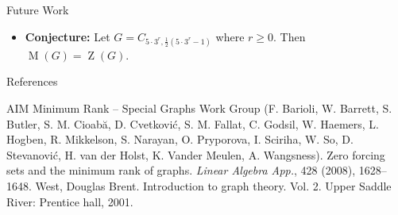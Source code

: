 \documentclass[final]{beamer}
\newcommand{\M}{\operatorname{M}}
\newcommand{\Z}{\operatorname{Z}}
\newcommand{\bit}{\begin{itemize}}
\newcommand{\eit}{\end{itemize}}
\begin{document}
\begin{frame}{}
\begin{columns}[t]
\begin{column}{0.38 \linewidth}
\begin{block}{Future Work}
\bit
\item {\bf Conjecture:} Let $G =  C_{5\cdot 3^r,\frac{1}{2}(5\cdot3^r-1)}$
	where $r \geq 0$. Then $\M(G) = \Z(G)$. 
\eit
\end{block}

        
        


        
        

\begin{block}{References}
\begin{thebibliography}{20}
      
 AIM Minimum Rank -- Special Graphs Work Group (F. Barioli, W. Barrett, S. Butler, S. M. Cioab\u{a}, D. Cvetkovi\'c, S. M. Fallat, C. Godsil, W. Haemers, L. Hogben,  R. Mikkelson,  S. Narayan,  O. Pryporova,   I. Sciriha,  W. So,   D. Stevanovi\'c,  H. van der Holst, K. Vander Meulen,  A. Wangsness).  Zero forcing sets and the minimum rank  of graphs.   {\em Linear Algebra App.}, 428 (2008),  1628--1648.
 West, Douglas Brent. Introduction to graph theory. Vol. 2. Upper Saddle River: Prentice hall, 2001.
\end{thebibliography}
\end{block}

\end{column}%

\end{columns}
\end{frame}
\end{document}
